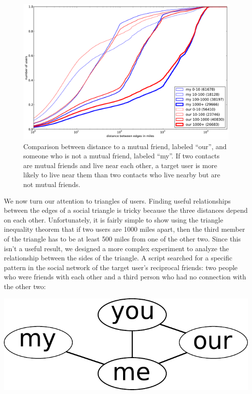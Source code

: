 \begin{figure}[tbh]
\centering
\includegraphics[width=\linewidth]{figures/near_triads.pdf}
\caption{
Comparison between distance to a mutual friend, labeled ``our'', and someone
who is not a mutual friend, labeled ``my''.
If two contacts are mutual friends and live near each other, a target user is
more likely to live near them than two contacts who live nearby but are not
mutual friends.
}
\label{fig:NearTriads}
\end{figure}


We now turn our attention to triangles of users.
%
Finding useful relationships between the edges of a social triangle is tricky
because the three distances depend on each other.
%
Unfortunately, it is fairly simple to show using the triangle inequality theorem
that if two users are 1000 miles apart, then the third member of the triangle
has to be at least 500 miles from one of the other two.
Since this isn't a useful result, we designed a more complex experiment to
analyze the relationship between the sides of the triangle.
A script searched for a specific pattern in the social network of
the target user's reciprocal friends: two people who were friends with each
other and a third person who had no connection with the other two:

\begin{center}
\includegraphics[width=0.3\linewidth]{figures/near_triads_dia.pdf}
\end{center}

